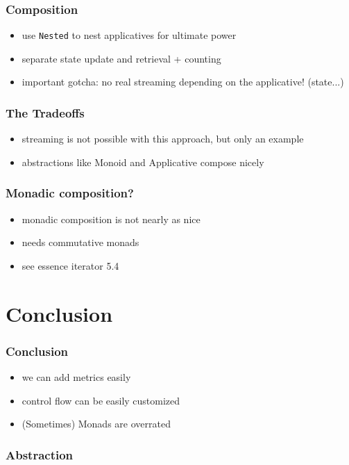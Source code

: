 \documentclass[aspectratio=169]{beamer}
\begin{document}
\begin{frame}
  \frametitle{Composition}
  \begin{itemize}
  \item use \texttt{Nested} to nest applicatives for ultimate power
  \item separate state update and retrieval + counting
  \item important gotcha: no real streaming depending on the applicative! (state...)
  \end{itemize}
\end{frame}

\begin{frame}
  \frametitle{The Tradeoffs}
  \begin{itemize}
  \item streaming is not possible with this approach, but only an example
  \item abstractions like Monoid and Applicative compose nicely
  \end{itemize}
\end{frame}

\begin{frame}
  \frametitle{Monadic composition?}
  \begin{itemize}
  \item monadic composition is not nearly as nice
  \item needs commutative monads
  \item see essence iterator 5.4
  \end{itemize}
\end{frame}

\section{Conclusion}\label{sec:conclusion}

\begin{frame}
  \frametitle{Conclusion}
  \begin{itemize}
  \item we can add metrics easily
  \item control flow can be easily customized
  \item (Sometimes) Monads are overrated
  \end{itemize}
\end{frame}

\begin{frame}
  \frametitle{Abstraction}
\end{frame}
\end{document}
